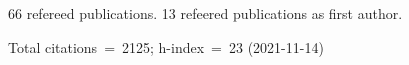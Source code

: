 66 refereed publications. 13 refeered publications as first author.

Total citations~=~2125; h-index~=~23 (2021-11-14)